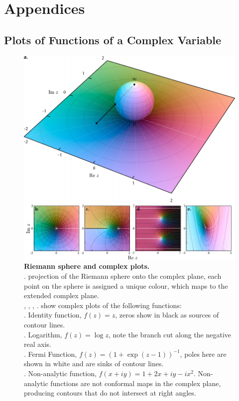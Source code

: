 \chapter{Appendices}

\renewcommand*{\chaptermarkformat}{}
\section{Plots of Functions of a Complex Variable} \label{sec:f(z)}

\begin{figure}
 \includegraphics{figs/app/Riemann.pdf}
 \caption[Riemann sphere and complex plots]{\small \label{fig:riemann}
 \textbf{Riemann sphere and complex plots.}\small\\
 \subA. projection of the Riemann sphere onto the complex plane, each point on
 the sphere is assigned a unique colour, which maps to the extended complex
 plane.\\
 \subB, \subC, \subD, \subE. show complex plots of the following functions:
 \\
 \subB. Identity function, $f(z) = z$, zeros show in black as sources of contour
 lines.
 \\
 \subC. Logarithm, $f(z) = \log z$, note the branch cut along the negative real
 axis.
 \\
 \subD. Fermi Function, $f(z) = (1+\exp(z-1))^{-1}$, poles here are shown in
 white and are sinks of contour lines.
 \\
 \subE. Non-analytic function, $f(x+iy)=1+2 x + i y - i x^2$. Non-analytic
 functions are not conformal maps in the complex plane, producing contours that
 do not intersect at right angles.
 }
\end{figure}

